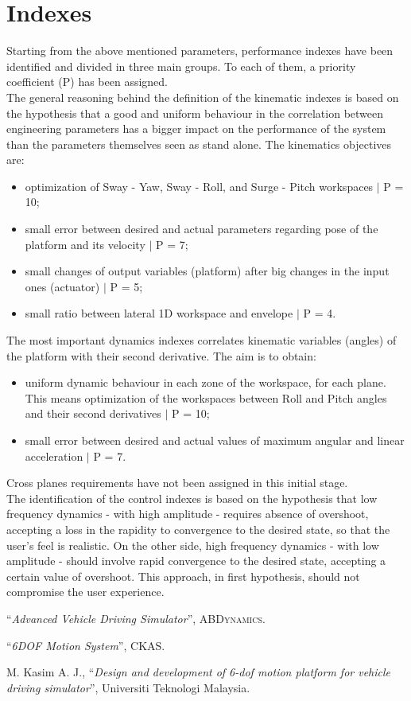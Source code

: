 \documentclass[10.5pt, twocolumn]{article}
\newcommand{\Virgolette}[1]{``#1''}
\begin{document}
\section{Indexes}
Starting from the above mentioned parameters, performance indexes have been identified and divided in three main groups. To each of them, a priority coefficient (P) has been assigned.
\\The general reasoning behind the definition of the kinematic indexes is based on the hypothesis that a good and uniform behaviour in the correlation between engineering parameters has a bigger impact on the performance of the system than the parameters themselves seen as stand alone. The kinematics objectives are:
\begin{itemize}
	\item optimization of Sway - Yaw, Sway - Roll, and Surge - Pitch workspaces $\mid$ P = 10;
	\item small error between desired and actual parameters regarding pose of the platform and its velocity $\mid$ P = 7;
	\item small changes of output variables (platform) after big changes in the input ones (actuator) $\mid$ P = 5;
	\item small ratio between lateral 1D workspace and envelope $\mid$ P = 4.
\end{itemize}
The most important dynamics indexes correlates kinematic variables (angles) of the platform with their second derivative. The aim is to obtain:
\begin{itemize}
	\item uniform dynamic behaviour in each zone of the workspace, for each plane. This means optimization of the workspaces between Roll and Pitch angles and their second derivatives $\mid$ P = 10;
	\item small error between desired and actual values of maximum angular and linear acceleration $\mid$ P = 7.
\end{itemize}
Cross planes requirements have not been assigned in this initial stage.
\\ The identification of the control indexes is based on the hypothesis that low frequency dynamics - with high amplitude - requires absence of overshoot, accepting a loss in the rapidity to convergence to the desired state, so that the user's feel is realistic. On the other side, high frequency dynamics - with low amplitude - should involve rapid convergence to the desired state, accepting a certain value of overshoot. This approach, in first hypothesis, should not compromise the user experience.

\begin{thebibliography}{}
\Virgolette{\textit{Advanced Vehicle Driving Simulator}}, \textsc{ABDynamics}.

\Virgolette{\textit{6DOF Motion System}}, \textsc{CKAS}.

M. Kasim A. J., \Virgolette{\textit{Design and development of 6-dof motion platform for vehicle driving simulator}}, Universiti Teknologi Malaysia.
\end{thebibliography}
\end{document}
